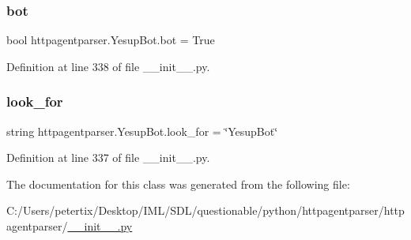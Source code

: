 \subsubsection{\texorpdfstring{bot}{bot}}
{\footnotesize\ttfamily bool httpagentparser.\+Yesup\+Bot.\+bot = True\hspace{0.3cm}{\ttfamily [static]}}



Definition at line 338 of file \+\_\+\+\_\+init\+\_\+\+\_\+.\+py.

\hypertarget{classhttpagentparser_1_1_yesup_bot_a6b50a26f418333b876bc49ba88853b8c}{}\label{classhttpagentparser_1_1_yesup_bot_a6b50a26f418333b876bc49ba88853b8c} 
\subsubsection{\texorpdfstring{look\+\_\+for}{look\_for}}
{\footnotesize\ttfamily string httpagentparser.\+Yesup\+Bot.\+look\+\_\+for = \char`\"{}Yesup\+Bot\char`\"{}\hspace{0.3cm}{\ttfamily [static]}}



Definition at line 337 of file \+\_\+\+\_\+init\+\_\+\+\_\+.\+py.



The documentation for this class was generated from the following file\+:\begin{DoxyCompactItemize}
\item 
C\+:/\+Users/petertix/\+Desktop/\+I\+M\+L/\+S\+D\+L/questionable/python/httpagentparser/httpagentparser/\hyperlink{____init_____8py}{\+\_\+\+\_\+init\+\_\+\+\_\+.\+py}\end{DoxyCompactItemize}
